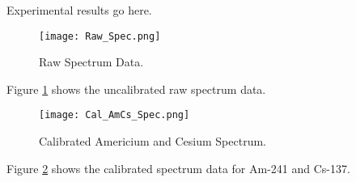 Experimental results go here.
\begin{figure}[h!]
  \texttt{[image: Raw\_Spec.png]}
  \caption{Raw Spectrum Data.}
  \label{fig:Raw_Spec1}
\end{figure}

Figure \ref{fig:Raw_Spec1} shows the uncalibrated raw spectrum data.


\begin{figure}[h!]
  \texttt{[image: Cal\_AmCs\_Spec.png]}
  \caption{Calibrated Americium and Cesium Spectrum.}
  \label{fig:Cal_AmCs_Spec1}
\end{figure}

Figure \ref{fig:Cal_AmCs_Spec1} shows the calibrated spectrum data for Am-241 and Cs-137.
